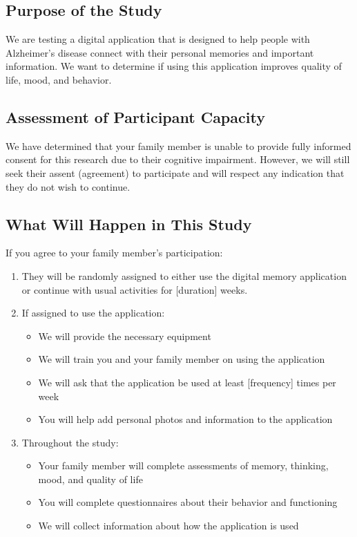 \subsection{Purpose of the Study}
We are testing a digital application that is designed to help people with Alzheimer's disease connect with their personal memories and important information. We want to determine if using this application improves quality of life, mood, and behavior.

\subsection{Assessment of Participant Capacity}
We have determined that your family member is unable to provide fully informed consent for this research due to their cognitive impairment. However, we will still seek their assent (agreement) to participate and will respect any indication that they do not wish to continue.

\subsection{What Will Happen in This Study}
If you agree to your family member's participation:
\begin{enumerate}
    \item They will be randomly assigned to either use the digital memory application or continue with usual activities for [duration] weeks.
    
    \item If assigned to use the application:
    \begin{itemize}
        \item We will provide the necessary equipment
        \item We will train you and your family member on using the application
        \item We will ask that the application be used at least [frequency] times per week
        \item You will help add personal photos and information to the application
    \end{itemize}
    
    \item Throughout the study:
    \begin{itemize}
        \item Your family member will complete assessments of memory, thinking, mood, and quality of life
        \item You will complete questionnaires about their behavior and functioning
        \item We will collect information about how the application is used
    \end{itemize}
\end{enumerate}

